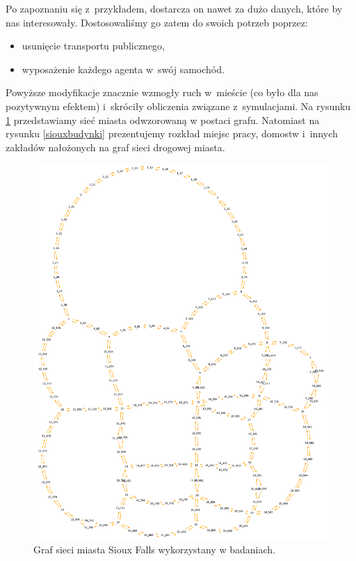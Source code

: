 \documentclass[twoside,12pt]{report}
\begin{document}
\vspace*{20px}
Po zapoznaniu się z~przykładem, dostarcza on nawet za dużo danych, które by nas interesowały. Dostosowaliśmy go zatem do swoich potrzeb poprzez:

\begin{itemize}
\item usunięcie transportu publicznego,
\item wyposażenie każdego agenta w~swój samochód.
\end{itemize}

Powyższe modyfikacje znacznie wzmogły ruch w~mieście (co było dla nas pozytywnym efektem) i~skróciły obliczenia związane z~symulacjami. Na rysunku \ref{siouxsiec} przedstawiamy sieć miasta odwzorowaną w postaci grafu. Natomiast na rysunku \ref{siouxbudynki}  prezentujemy  rozkład miejsc pracy, domostw i~innych zakładów nałożonych na graf sieci drogowej miasta.

\begin{figure}[ht]
\centering
\includegraphics[totalheight=0.6\textheight]{img/sioux/network}
\caption{Graf sieci miasta Sioux Falls wykorzystany w badaniach.} 
\label{siouxsiec}
\end{figure}
\end{document}
